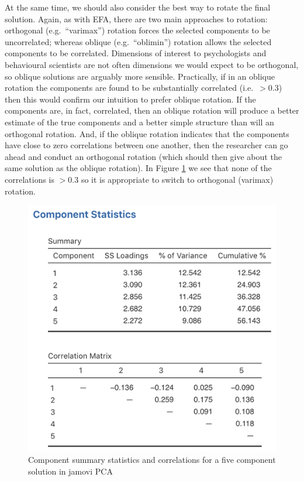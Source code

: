\documentclass[
]{book}
\begin{document}
At the same time, we should also consider the best way to rotate the final solution. Again, as with EFA, there are two main approaches to rotation: orthogonal (e.g.~``varimax'') rotation forces the selected components to be uncorrelated; whereas oblique (e.g.~``oblimin'') rotation allows the selected components to be correlated. Dimensions of interest to psychologists and behavioural scientists are not often dimensions we would expect to be orthogonal, so oblique solutions are arguably more sensible. Practically, if in an oblique rotation the components are found to be substantially correlated (i.e.~\(>0.3\)) then this would confirm our intuition to prefer oblique rotation. If the components are, in fact, correlated, then an oblique rotation will produce a better estimate of the true components and a better simple structure than will an orthogonal rotation. And, if the oblique rotation indicates that the components have close to zero correlations between one another, then the researcher can go ahead and conduct an orthogonal rotation (which should then give about the same solution as the oblique rotation). In Figure \ref{fig:pca4} we see that none of the correlations is \(>0.3\) so it is appropriate to switch to orthogonal (varimax) rotation.

\begin{figure}

{\centering \includegraphics[width=1\linewidth]{img/factoranalysis/pca4} 

}

\caption{Component summary statistics and correlations for a five component solution in jamovi PCA}\label{fig:pca4}
\end{figure}
\end{document}
